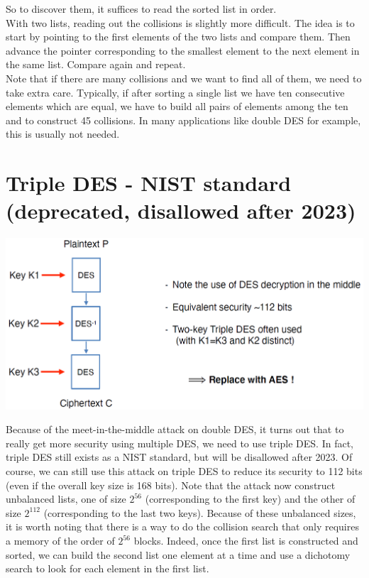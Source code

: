 	So to discover them, it suffices to read the sorted list in order.\\
	With two lists, reading out the collisions is slightly more difficult. 
	The idea is to start by pointing to the first elements of the two lists and compare them. 
	Then advance the pointer corresponding to the smallest element to the next element in the same list. Compare again and repeat.\\
	Note that if there are many collisions and we want to find all of them, we need to take extra care. 
	Typically, if after sorting a single list we have ten consecutive elements which are equal, we have to build all pairs of elements among the ten and to construct 45 collisions. 
	In many applications like double DES for example, this is usually not needed.
	
\section{Triple DES - NIST standard (deprecated, disallowed after 2023)}
	\begin{center}
		\includegraphics[width=140mm]{Graphics/Cryptanalysis/c3.png}
	\end{center}
	Because of the meet-in-the-middle attack on double DES, it turns out that to really get more security using multiple DES, we need to use triple DES. 
	In fact, triple DES still exists as a NIST standard, but will be disallowed after 2023. 
	Of course, we can still use this attack on triple DES to reduce its security to 112 bits (even if the overall key size is 168 bits). 
	Note that the attack now construct unbalanced lists, one of size $2^{56}$ (corresponding to the first key) and the other of size $2^{112}$ (corresponding to the last two keys). 
	Because of these unbalanced sizes, it is worth noting that there is a way to do the collision search that only requires a memory of the order of $2^{56}$ blocks. 
	Indeed, once the first list is constructed and sorted, we can build the second list one element at a time and use a dichotomy search to look for each element in the first list.\\

